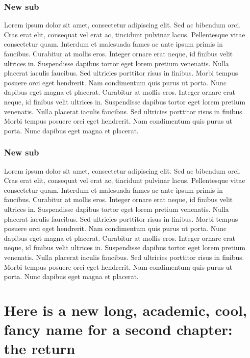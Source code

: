 \documentclass[11pt, a4paper]{report}
\begin{document}
\subsection{New sub}

\par Lorem ipsum dolor sit amet, consectetur adipiscing elit. Sed ac bibendum orci. Cras erat elit, consequat vel erat ac, tincidunt pulvinar lacus. Pellentesque vitae consectetur quam. Interdum et malesuada fames ac ante ipsum primis in faucibus. Curabitur at mollis eros. Integer ornare erat neque, id finibus velit ultrices in. Suspendisse dapibus tortor eget lorem pretium venenatis. Nulla placerat iaculis faucibus. Sed ultricies porttitor risus in finibus. Morbi tempus posuere orci eget hendrerit. Nam condimentum quis purus ut porta. Nunc dapibus eget magna et placerat. Curabitur at mollis eros. Integer ornare erat neque, id finibus velit ultrices in. Suspendisse dapibus tortor eget lorem pretium venenatis. Nulla placerat iaculis faucibus. Sed ultricies porttitor risus in finibus. Morbi tempus posuere orci eget hendrerit. Nam condimentum quis purus ut porta. Nunc dapibus eget magna et placerat.

\subsection{New sub}

\par Lorem ipsum dolor sit amet, consectetur adipiscing elit. Sed ac bibendum orci. Cras erat elit, consequat vel erat ac, tincidunt pulvinar lacus. Pellentesque vitae consectetur quam. Interdum et malesuada fames ac ante ipsum primis in faucibus. Curabitur at mollis eros. Integer ornare erat neque, id finibus velit ultrices in. Suspendisse dapibus tortor eget lorem pretium venenatis. Nulla placerat iaculis faucibus. Sed ultricies porttitor risus in finibus. Morbi tempus posuere orci eget hendrerit. Nam condimentum quis purus ut porta. Nunc dapibus eget magna et placerat. Curabitur at mollis eros. Integer ornare erat neque, id finibus velit ultrices in. Suspendisse dapibus tortor eget lorem pretium venenatis. Nulla placerat iaculis faucibus. Sed ultricies porttitor risus in finibus. Morbi tempus posuere orci eget hendrerit. Nam condimentum quis purus ut porta. Nunc dapibus eget magna et placerat.

\chapter{Here is a new long, academic, cool, fancy name for a second chapter: the return} \label{chap:2}
\end{document}

